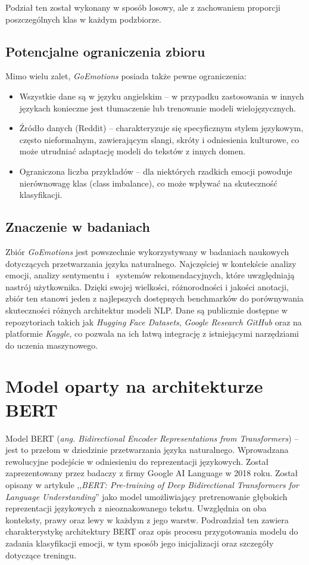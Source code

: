 \documentclass[wmii, inf, mgr]{uwmthesis}
\begin{document}
Podział ten został wykonany w sposób losowy, ale z zachowaniem proporcji poszczególnych klas w każdym podzbiorze.

\subsection{Potencjalne ograniczenia zbioru}
Mimo wielu zalet, \textit{GoEmotions} posiada także pewne ograniczenia:
\begin{itemize}

    \item {Wszystkie dane są w języku angielskim} -- w przypadku zastosowania w innych językach konieczne jest tłumaczenie lub trenowanie modeli wielojęzycznych.

    \item {Źródło danych (Reddit)} -- charakteryzuje się specyficznym stylem językowym, często nieformalnym, zawierającym slangi, skróty i odniesienia kulturowe, co może utrudniać adaptację modeli do tekstów z innych domen.

    \item {Ograniczona liczba przykładów} -- dla niektórych rzadkich emocji powoduje nierównowagę klas (class imbalance), co może wpływać na skuteczność klasyfikacji.
\end{itemize}


\subsection{Znaczenie w badaniach}
Zbiór \textit{GoEmotions} jest powszechnie wykorzystywany w badaniach naukowych dotyczących przetwarzania języka naturalnego. Najczęściej w kontekście analizy emocji, analizy sentymentu i~ systemów rekomendacyjnych, które uwzględniają nastrój użytkownika. Dzięki swojej wielkości, różnorodności i jakości anotacji, zbiór ten stanowi jeden z najlepszych dostępnych benchmarków do porównywania skuteczności różnych architektur modeli NLP. Dane są publicznie dostępne w repozytoriach takich jak \textit{Hugging Face Datasets}, \textit{Google Research GitHub} oraz na platformie \textit{Kaggle}, co pozwala na ich łatwą integrację z istniejącymi narzędziami do uczenia maszynowego.


\section{Model oparty na architekturze BERT}
Model BERT (\textit{ang. Bidirectional Encoder Representations from Transformers}) -- jest to przełom w dziedzinie przetwarzania języka naturalnego. Wprowadzana rewolucyjne podejście w odniesieniu do reprezentacji językowych. Został zaprezentowany przez badaczy z firmy Google AI Language w 2018 roku. Został opisany w artykule ,,\textit{BERT: Pre-training of Deep Bidirectional Transformers for Language Understanding}'' \cite{BERT} jako model umożliwiający pretrenowanie głębokich reprezentacji językowych z nieoznakowanego tekstu. Uwzględnia on oba konteksty, prawy oraz lewy w każdym z jego warstw. Podrozdział ten zawiera charakterystykę architektury BERT oraz opis procesu przygotowania modelu do zadania klasyfikacji emocji, w tym sposób jego inicjalizacji oraz szczegóły dotyczące treningu.
\end{document}

